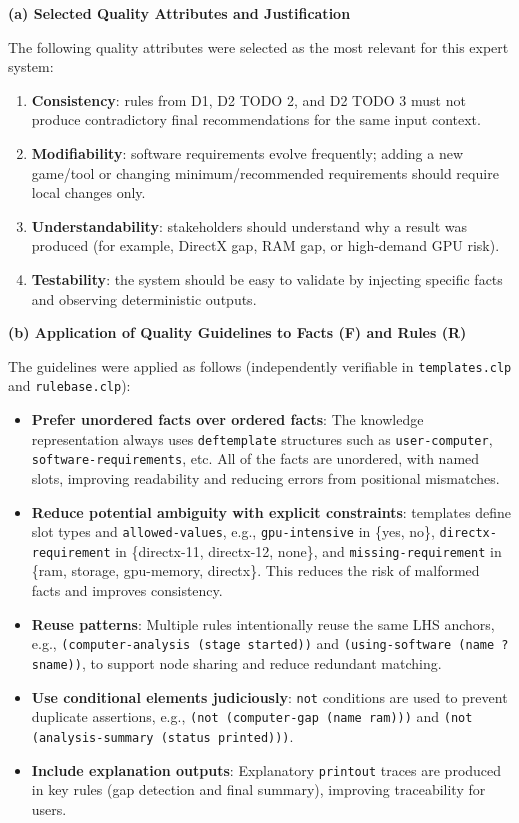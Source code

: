 \documentclass{article}
\begin{document}
\noindent\textbf{(a) Selected Quality Attributes and Justification}

\noindent The following quality attributes were selected as the most relevant for this expert system:

\begin{enumerate}
    \item \textbf{Consistency}: rules from D1, D2 TODO 2, and D2 TODO 3 must not produce contradictory final recommendations for the same input context.
    \item \textbf{Modifiability}: software requirements evolve frequently; adding a new game/tool or changing minimum/recommended requirements should require local changes only.
    \item \textbf{Understandability}: stakeholders should understand why a result was produced (for example, DirectX gap, RAM gap, or high-demand GPU risk).
    \item \textbf{Testability}: the system should be easy to validate by injecting specific facts and observing deterministic outputs.
\end{enumerate}

\noindent\textbf{(b) Application of Quality Guidelines to Facts (F) and Rules (R)}

\noindent The guidelines were applied as follows (independently verifiable in \texttt{templates.clp} and \texttt{rulebase.clp}):

\begin{itemize}
    \item \textbf{Prefer unordered facts over ordered facts}: The knowledge representation always uses \texttt{deftemplate} structures such as \texttt{user-computer}, \texttt{software-requirements}, etc. All of the facts are unordered, with named slots, improving readability and reducing errors from positional mismatches.
    \item \textbf{Reduce potential ambiguity with explicit constraints}: templates define slot types and \texttt{allowed-values}, e.g., \texttt{gpu-intensive} in \{yes, no\}, \texttt{directx-requirement} in \{directx-11, directx-12, none\}, and \texttt{missing-requirement} in \{ram, storage, gpu-memory, directx\}. This reduces the risk of malformed facts and improves consistency.
    \item \textbf{Reuse patterns}: Multiple rules intentionally reuse the same LHS anchors, e.g., \texttt{(computer-analysis (stage started))} and \texttt{(using-software (name ?sname))}, to support node sharing and reduce redundant matching.
    \item \textbf{Use conditional elements judiciously}: \texttt{not} conditions are used to prevent duplicate assertions, e.g., \texttt{(not (computer-gap (name ram)))} and \texttt{(not (analysis-summary (status printed)))}.
    \item \textbf{Include explanation outputs}: Explanatory \texttt{printout} traces are produced in key rules (gap detection and final summary), improving traceability for users.
\end{itemize}
\end{document}
